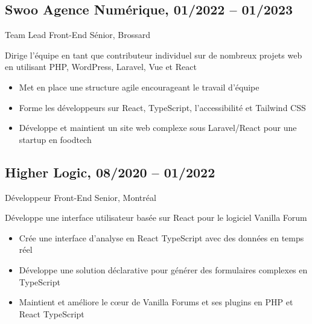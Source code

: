 \documentclass{article}
\begin{document}
\begin{paracol}{2}
\begin{rightcolumn}
    \vspace{1em}

    \subsection{Swoo Agence Numérique, 01/2022 -- 01/2023}
    {Team Lead Front-End Sénior, Brossard\par}
    {
      Dirige l’équipe en tant que contributeur individuel sur de nombreux projets web en utilisant PHP, WordPress, Laravel, Vue et React
    \par}
    \begin{itemize}
      \item Met en place une structure agile encourageant le travail d’équipe
      \item Forme les développeurs sur React, TypeScript, l’accessibilité et Tailwind CSS
      \item Développe et maintient un site web complexe sous Laravel/React pour une startup en foodtech
    \end{itemize}

    \pagebreak

    \subsection{Higher Logic, 08/2020 -- 01/2022}  
    {Développeur Front-End Senior, Montréal\par}  
    {  
      Développe une interface utilisateur basée sur React pour le logiciel Vanilla Forum
    \par}  
    \begin{itemize}  
      \item Crée une interface d’analyse en React TypeScript avec des données en temps réel  
      \item Développe une solution déclarative pour générer des formulaires complexes en TypeScript  
      \item Maintient et améliore le cœur de Vanilla Forums et ses plugins en PHP et React TypeScript  
    \end{itemize}  

    \vspace{1em}  


\end{rightcolumn}
\end{paracol}
\end{document}
